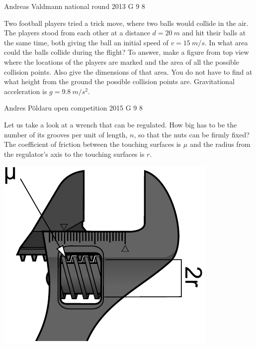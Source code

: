 \documentclass[11pt]{article}
\begin{document}
{Andreas Valdmann} %
{national round} %
{2013} %
{G 9} %
{8} %
{

\ifEngStatement
Two football players tried a trick move, where two balls would collide in the air. The players stood from each other at a distance $d = \SI{20}{m}$ and hit their balls at the same time, both giving the ball an initial speed of $v = \SI{15}{m/s}$. In what area could the balls collide during the flight? To answer, make a figure from top view where the locations of the players are marked and the area of all the possible collision points. Also give the dimensions of that area. You do not have to find at what height from the ground the possible collision points are. Gravitational acceleration is $g = \SI{9,8}{m/s^2}$.
\fi
}

{Andres Põldaru} %
{open competition} %
{2015} %
{G 9} %
{8} %
{

\ifEngStatement
Let us take a look at a wrench that can be regulated. How big has to be the number of its grooves per unit of length, $n$, so that the nuts can be firmly fixed? The coefficient of friction between the touching surfaces is $\mu$ and the radius from the regulator’s axis to the touching surfaces is $r$.
\begin{center}%
\includegraphics[width=0.4\linewidth]{2015-lahg-09-mutriv6ti_joonis}%
\end{center}
\fi
}
\end{document}
